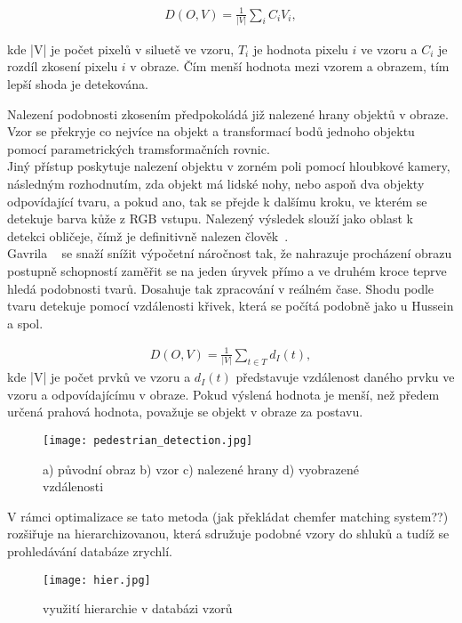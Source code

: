 \begin{eqnarray}
 D(O,V) = \frac{1}{|V|}\sum_{i}^{}C_{i}V_{i} ,
\end{eqnarray}

kde |V| je počet pixelů v siluetě ve vzoru, $ T_{i} $ je hodnota pixelu $ i $ ve vzoru a $ C_{i} $ je rozdíl zkosení pixelu $ i $ v obraze. Čím menší hodnota mezi vzorem a obrazem, tím lepší shoda je detekována.

Nalezení podobnosti zkosením předpokoládá již nalezené hrany objektů v obraze. Vzor se překryje co nejvíce na objekt a transformací bodů jednoho objektu pomocí parametrických tramsformačních rovnic.\\

Jiný přístup poskytuje nalezení objektu v zorném poli pomocí hloubkové kamery, následným rozhodnutím, zda objekt má lidské nohy, nebo aspoň dva objekty odpovídající tvaru, a pokud ano, tak se přejde k dalšímu kroku, ve kterém se detekuje barva kůže z RGB vstupu. Nalezený výsledek slouží jako oblast k detekci obličeje, čímž je definitivně nalezen člověk~\cite{10}.\\

Gavrila ~\cite{7} se snaží snížit výpočetní náročnost tak, že nahrazuje procházení obrazu postupně schopností zaměřit se na jeden úryvek přímo a ve druhém kroce teprve hledá podobnosti tvarů. Dosahuje tak zpracování v reálném čase.
Shodu podle tvaru detekuje pomocí vzdálenosti křivek, která se počítá podobně jako u Hussein a spol.~\cite{9} 

\begin{eqnarray}
 D(O,V) = \frac{1}{|V|}\sum_{t\in T}^{}d_{I}(t) ,
\end{eqnarray}
kde |V| je počet prvků ve vzoru a $ d_{I}(t) $ představuje vzdálenost daného prvku ve vzoru a odpovídajícímu v obraze. Pokud výslená hodnota je menší, než předem určená prahová hodnota, považuje se objekt v obraze za postavu. 

\begin{figure}[h]
\centering
\texttt{[image: pedestrian\_detection.jpg]}
\caption{a) původní obraz b) vzor c) nalezené hrany d) vyobrazené vzdálenosti~\cite{7} }
\end{figure}

V rámci optimalizace se tato metoda (jak překládat chemfer matching system??) rozšiřuje na hierarchizovanou, která sdružuje podobné vzory do shluků a tudíž se prohledávání databáze zrychlí.
\begin{figure}[h]
\centering
\texttt{[image: hier.jpg]}
\caption{využití hierarchie v databázi vzorů~\cite{7} }
\end{figure}

